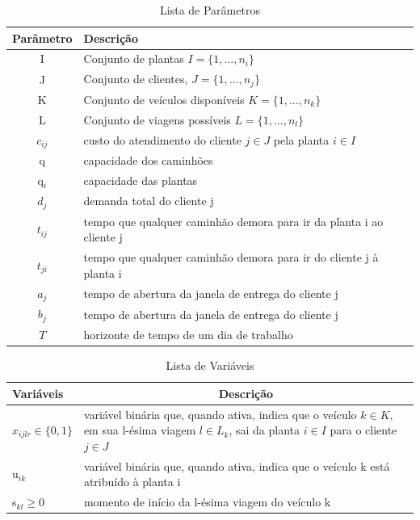 \begin{table}[h!]
  \centering
  \begin{tabular}{cl}
  \toprule
  \textbf{Parâmetro} & \textbf{Descrição} \\
  \hline
  I & Conjunto de plantas $I=\{1,\ldots,n_i\}$\\
  J & Conjunto de clientes, $J = \{1,\ldots,n_j\}$ \\
  K & Conjunto de veículos disponíveis $K=\{1,\ldots,n_k\}$\\
  L & Conjunto de viagens possíveis $L=\{1,\ldots,n_l\}$\\
  $c_{ij}$ & custo do atendimento do cliente $j\in J$ pela planta $i\in I$ \\
  q & capacidade dos caminhões \\
  q$_{i}$ & capacidade das plantas \\
  $d_{j}$ & demanda total do cliente j \\
  $t_{ij}$ & tempo que qualquer caminhão demora para ir da planta i ao cliente j \\
  $t_{ji}$ & tempo que qualquer caminhão demora para ir do cliente j à planta i \\
  $a_{j}$ & tempo de abertura da janela de entrega do cliente j \\
  $b_{j}$ & tempo de abertura da janela de entrega do cliente j\\
  $T$ & horizonte de tempo de um dia de trabalho \\
  \hline
  \end{tabular}
  \caption{Lista de Parâmetros}
  \label{tab:parametros}
\end{table}


\begin{table}[ht!]
  \centering
  \begin{tabular}{p{3cm}p{10cm}}
  \toprule
  \textbf{Variáveis} & \multicolumn{1}{c}{\textbf{Descrição}} \\
  \midrule
  $x_{ijlr}\in \{0,1\}$ & variável binária que, quando ativa, indica que o veículo $k \in K$, em sua l-é\-si\-ma via\-gem $l\in L_k$, sai
  da planta $i\in I$ para o cliente $j\in J$ \\
  u$_{ik}$ & variável binária que, quando ativa, indica que o veículo k está atribuído à planta i \\
  s$_{kl}\geq 0$ & momento de início da l-ésima viagem do veículo k \\
  \bottomrule
  \end{tabular}
  \caption{Lista de Variáveis}
  \label{tab:variables}
\end{table}



